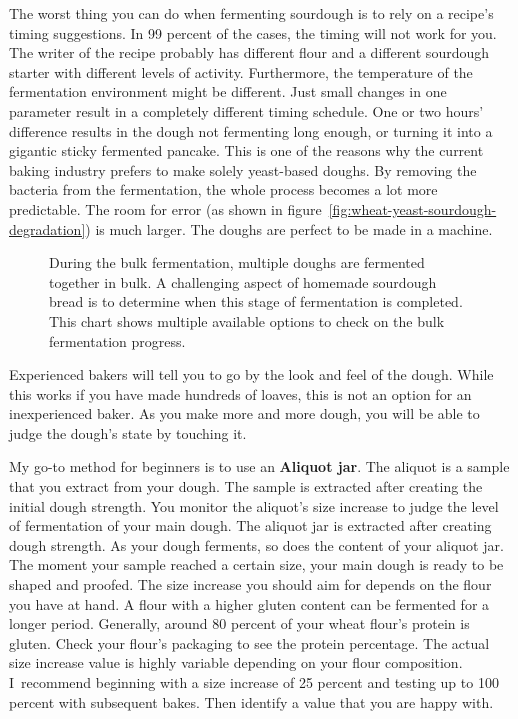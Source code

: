 The worst thing you can do when fermenting sourdough
is to rely on a recipe's timing suggestions. In 99 percent
of the cases, the timing will not work for you. The writer
of the recipe probably has different flour and a different
sourdough starter with different levels of activity. Furthermore,
the temperature of the fermentation environment might be
different. Just small changes in one parameter result
in a completely different timing schedule. One or two hours'
difference results in the dough not fermenting long enough, or
turning it into a gigantic sticky fermented pancake. This
is one of the reasons why the current baking industry prefers
to make solely yeast-based doughs. By removing the bacteria
from the fermentation, the whole process becomes a lot more
predictable. The room for error (as shown in figure~\ref{fig:wheat-yeast-sourdough-degradation})
is much larger. The doughs are perfect to be made in a
machine.

\begin{figure}[!htb]
\begin{center}
  
  \caption{During the bulk fermentation, multiple doughs are fermented together in bulk.
  A challenging aspect of homemade sourdough bread is to determine when this stage of
  fermentation is completed. This chart shows multiple available options to check on the bulk
  fermentation progress.}%
  \label{fig:bulk-fermentation}
\end{center}
\end{figure}

Experienced bakers will tell you to go by the look and feel of
the dough. While this works if you have made hundreds of loaves,
this is not an option for an inexperienced baker. As
you make more and more dough, you will be able to judge
the dough's state by touching it.

My go-to method for beginners is to use an \textbf{Aliquot jar}.
The aliquot is a sample that you extract from your dough. The
sample is extracted after creating the initial dough strength.
You monitor the aliquot's size increase to judge the
level of fermentation of your main dough. The aliquot
jar is extracted after creating dough strength. As your
dough ferments, so does the content of your aliquot jar. The moment your
sample reached a certain size, your main dough is ready
to be shaped and proofed. The size increase you should
aim for depends on the flour you have at hand. A flour
with a higher gluten content can be fermented for a
longer period. Generally, around 80 percent
of your wheat flour's protein is gluten. Check your flour's
packaging to see the protein percentage. The actual size increase
value is highly variable depending on your flour composition.
I~recommend beginning with a size increase of 25 percent and testing
up to 100 percent with subsequent bakes. Then identify a value
that you are happy with.

